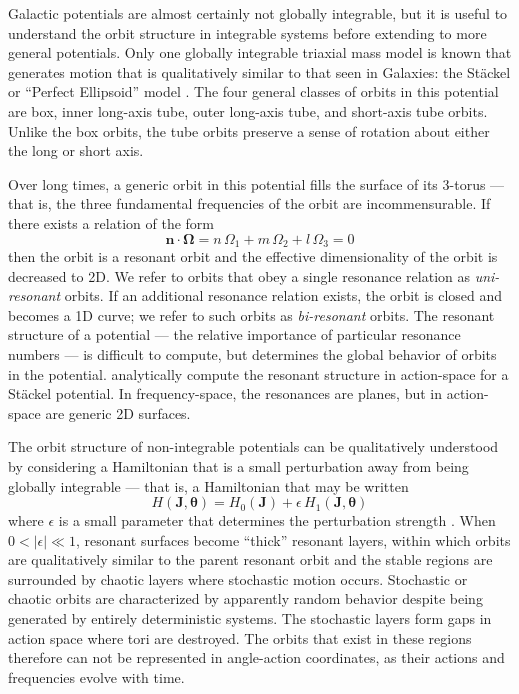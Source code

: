 \documentclass[letterpaper,12pt,preprint]{aastex}
\begin{document}
Galactic potentials are almost certainly not globally integrable, but it is useful to understand the orbit structure in integrable systems before extending to more general potentials. Only one globally integrable triaxial mass model is known that generates motion that is qualitatively similar to that seen in Galaxies: the St\"ackel or ``Perfect Ellipsoid'' model \citep[e.g.,][]{kuzmin56, kuzmin73, deZeeuw85, cincotta06}. The four general classes of orbits in this potential are box, inner long-axis tube, outer long-axis tube, and short-axis tube orbits. Unlike the box orbits, the tube orbits preserve a sense of rotation about either the long or short axis.

Over long times, a generic orbit in this potential fills the surface of its 3-torus --- that is, the three fundamental frequencies of the orbit are incommensurable. If there exists a relation of the form
\begin{equation}
	\boldsymbol{n} \cdot \boldsymbol{\Omega} = n\, \Omega_1 + m\, \Omega_2 + l\, \Omega_3 = 0
\end{equation}
then the orbit is a resonant orbit and the effective dimensionality of the orbit is decreased to 2D. We refer to orbits that obey a single resonance relation as \emph{uni-resonant} orbits. If an additional resonance relation exists, the orbit is closed and becomes a 1D curve; we refer to such orbits as \emph{bi-resonant} orbits. The resonant structure of a potential --- the relative importance of particular resonance numbers --- is difficult to compute, but determines the global behavior of orbits in the potential. \cite{cincotta06} analytically compute the resonant structure in action-space for a St\"ackel potential. In frequency-space, the resonances are planes, but in action-space are generic 2D surfaces.

The orbit structure of non-integrable potentials can be qualitatively understood by considering a Hamiltonian that is a small perturbation away from being globally integrable --- that is, a Hamiltonian that may be written
\begin{equation}
	H(\boldsymbol{J}, \boldsymbol{\theta}) = H_0(\boldsymbol{J}) + \epsilon \, H_1(\boldsymbol{J}, \boldsymbol{\theta})
\end{equation}
where $\epsilon$ is a small parameter that determines the perturbation strength \citep[a complete description of perturbation theory applied to nonlinear Hamiltonians is given in][]{lichtenberg83}. When $0 < |\epsilon| \ll 1$, resonant surfaces become ``thick'' resonant layers, within which orbits are qualitatively similar to the parent resonant orbit \citep[e.g.,][]{merritt99} and the stable regions are surrounded by chaotic layers where stochastic motion occurs. Stochastic or chaotic orbits are characterized by apparently random behavior despite being generated by entirely deterministic systems. The stochastic layers form gaps in action space where tori are destroyed. The orbits that exist in these regions therefore can not be represented in angle-action coordinates, as their actions and frequencies evolve with time. 
\end{document}
